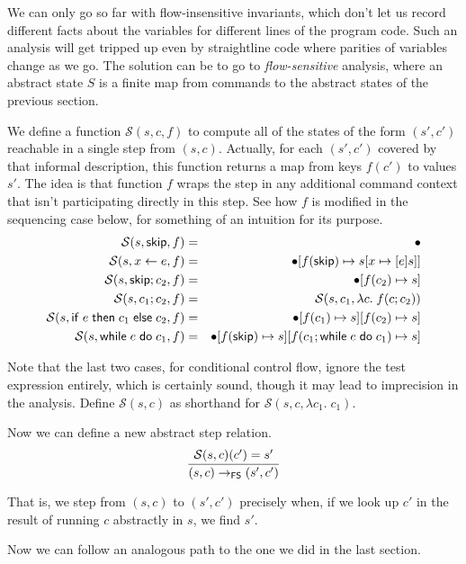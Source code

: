 \documentclass{amsbook}
\theoremstyle{definition}
\theoremstyle{remark}
\numberwithin{section}{chapter}
\numberwithin{equation}{chapter}
\begin{document}
We can only go so far with flow-insensitive invariants, which don't let us record different facts about the variables for different lines of the program code.
Such an analysis will get tripped up even by straightline code where parities of variables change as we go.
The solution can be to go to \emph{flow-sensitive} analysis, where an abstract state $S$ is a finite map from commands to the abstract states of the previous section.

\newcommand{\absstep}[3]{\mathcal S(#1, #2, #3)}
\newcommand{\absstepo}[2]{\mathcal S(#1, #2)}

We define a function $\absstep{s}{c}{f}$ to compute all of the states of the form $(s', c')$ reachable in a single step from $(s, c)$.
Actually, for each $(s', c')$ covered by that informal description, this function returns a map from keys $f(c')$ to values $s'$.
The idea is that function $f$ wraps the step in any additional command context that isn't participating directly in this step.
See how $f$ is modified in the sequencing case below, for something of an intuition for its purpose.
\begin{eqnarray*}
  \absstep{s}{\skipe}{f} &=& \mempty \\
  \absstep{s}{\assign{x}{e}}{f} &=& \mupd{\mempty}{f(\skipe)}{\mupd{s}{x}{\absexp{e}s}} \\
  \absstep{s}{\skipe; c_2}{f} &=& \mupd{\mempty}{f(c_2)}{s} \\
  \absstep{s}{c_1; c_2}{f} &=& \absstep{s}{c_1}{\lambda c. \; f(c; c_2)} \\
  \absstep{s}{\ifte{e}{c_1}{c_2}}{f} &=& \mupd{\mupd{\mempty}{f(c_1)}{s}}{f(c_2)}{s} \\
  \absstep{s}{\while{e}{c_1}}{f} &=& \mupd{\mupd{\mempty}{f(\skipe)}{s}}{f(c_1; \while{e}{c_1})}{s}
\end{eqnarray*}

Note that the last two cases, for conditional control flow, ignore the test expression entirely, which is certainly sound, though it may lead to imprecision in the analysis.
Define $\absstepo{s}{c}$ as shorthand for $\absstep{s}{c}{\lambda c_1. \; c_1}$.

Now we can define a new abstract step relation.
$$\infer{(s, c) \to_\mathsf{FS} (s', c')}{
  \absstepo{s}{c}(c') = s'
}$$

That is, we step from $(s, c)$ to $(s', c')$ precisely when, if we look up $c'$ in the result of running $c$ abstractly in $s$, we find $s'$.

Now we can follow an analogous path to the one we did in the last section.
\end{document}
